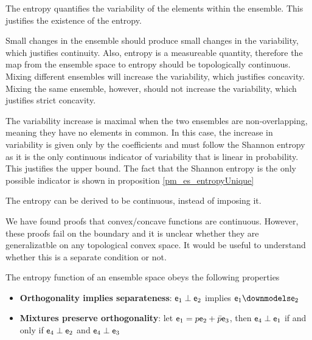 \begin{justification}
	The entropy quantifies the variability of the elements within the ensemble. This justifies the existence of the entropy.
	
	Small changes in the ensemble should produce small changes in the variability, which justifies continuity. Also, entropy is a measureable quantity, therefore the map from the ensemble space to entropy should be topologically continuous. Mixing different ensembles will increase the variability, which justifies concavity. Mixing the same ensemble, however, should not increase the variability, which justifies strict concavity. 
	
	The variability increase is maximal when the two ensembles are non-overlapping, meaning they have no elements in common. In this case, the increase in variability is given only by the coefficients and must follow the Shannon entropy as it is the only continuous indicator of variability that is linear in probability. This justifies the upper bound. The fact that the Shannon entropy is the only possible indicator is shown in proposition \ref{pm_es_entropyUnique}
\end{justification}

\begin{conj}
	The entropy can be derived to be continuous, instead of imposing it.
\end{conj}

\begin{remark}
	We have found proofs that convex/concave functions are continuous. However, these proofs fail on the boundary and it is unclear whether they are generalizatble on any topological convex space. It would be useful to understand whether this is a separate condition or not.
\end{remark}


\begin{axiom}
	The entropy function of an ensemble space obeys the following properties
	\begin{itemize}
		\item \textbf{Orthogonality implies separateness}: $\mathsf{e}_1 \perp \mathsf{e}_2$ implies $\ens_1 \separate \ens_2$
		\item \textbf{Mixtures preserve orthogonality}: let $\mathsf{e}_1 = p \mathsf{e}_2 + \bar{p} \mathsf{e}_3$, then $\mathsf{e}_4 \perp \mathsf{e}_1$ if and only if $\mathsf{e}_4 \perp \mathsf{e}_2$ and $\mathsf{e}_4 \perp \mathsf{e}_3$
	\end{itemize}
\end{axiom}

